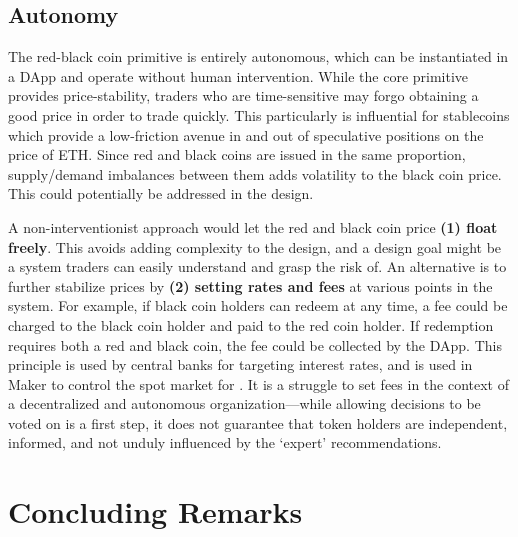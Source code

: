 
\subsection{Autonomy} 

The red-black coin primitive is entirely autonomous, which can be instantiated in a DApp and operate without human intervention. While the core primitive provides price-stability, traders who are time-sensitive may forgo obtaining a good price in order to trade quickly. This particularly is influential for stablecoins which provide a low-friction avenue in and out of speculative positions on the price of ETH. Since red and black coins are issued in the same proportion, supply/demand imbalances between them adds volatility to the black coin price. This could potentially be addressed in the design. 

A non-interventionist approach would let the red and black coin price \textbf{(1) float freely}. This avoids adding complexity to the design, and a design goal might be a system traders can easily understand and grasp the risk of. An alternative is to further stabilize prices by \textbf{(2) setting rates and fees} at various points in the system. For example, if black coin holders can redeem at any time, a fee could be charged to the black coin holder and paid to the red coin holder. If redemption requires both a red and black coin, the fee could be collected by the DApp. This principle is used by central banks for targeting interest rates, and is used in Maker to control the spot market for \dai. It is a struggle to set fees in the context of a decentralized and autonomous organization---while allowing decisions to be voted on is a first step, it does not guarantee that token holders are independent, informed, and not unduly influenced by the `expert' recommendations. 


\section{Concluding Remarks}

